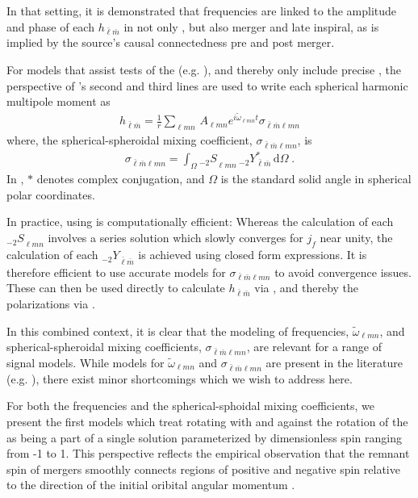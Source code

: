 \documentclass[twocolumn,aps,prd,floatfix,preprintnumbers,a4paper,nofootinbib,
superscriptaddress,10pt]{revtex4-1}
\newcommand{\cw}{\tilde{\omega}}
\def\jf{j_f}
\def\lmn{_{\ell m n}}
\def\LM{_{\bar{\ell} \bar{m}}}
\def\LMlmn{_{\bar{\ell} \bar{m} \ell m n}}
\begin{document}
%
In that setting, it is demonstrated that \qnm{} frequencies are linked to the amplitude and phase of each $h\LM$ in not only \rd{}, but also merger and late inspiral, as is implied by the source's causal connectedness pre and post merger.
%
%
\par For models that assist tests of the \nht{} (e.g. \cite{Berti:2005ys,London:2018gaq,Carullo:2018sfu}), and thereby only include precise , the perspective of 's second and third lines are used to write each spherical harmonic multipole moment as
%
\begin{align}
	\label{hlm}
	h\LM = \frac{1}{r} \sum\lmn \, A\lmn e^{i \cw\lmn t} \sigma\LMlmn
\end{align}
%
where, the spherical-spheroidal mixing coefficient, $\sigma\LMlmn$, is
%
\begin{align}
		\label{sigma}
		\sigma\LMlmn = \int_{\Omega} {_{-2}S}\lmn \,  {_{-2}}Y^*\LM \, \mathrm{d} \Omega \; .
\end{align}
%
In , $*$ denotes complex conjugation, and $\Omega$ is the standard solid angle in spherical polar coordinates.
%
\par In practice, using  is computationally efficient:
%
Whereas the calculation of each ${_{-2}S}\lmn$ involves a series solution which slowly converges for $\jf$ near unity, the calculation of each ${_{-2}Y}\LM$ is achieved using closed form expressions.
%
It is therefore efficient to use accurate models for $\sigma\LMlmn$ to avoid convergence issues. These can then be used directly to calculate $h\LM$ via , and thereby the \gw{} polarizations via .
%
%
\par In this combined context, it is clear that the modeling of \qnm{} frequencies, $\cw\lmn$, and spherical-spheroidal mixing coefficients, $\sigma\LMlmn$, are relevant for a range of \gw{} signal models.
%
While models for $\cw\lmn$ and $\sigma\LMlmn$ are present in the literature (e.g. \cite{Berti:2005ys, Berti:2014fga, Cook:2014cta}), there exist minor shortcomings which we wish to address here.
%
\par For both the \qnm{} frequencies and the spherical-sphoidal mixing coefficients, we present the first models which treat  rotating with and against the rotation of the \bh{} as being a part of a single solution parameterized by dimensionless \bh{} spin ranging from -1 to 1.
%
This perspective reflects the empirical observation that the remnant spin of \bbh{} mergers smoothly connects regions of positive and negative spin relative to the direction of the initial oribital angular momentum \cite{Husa:2015iqa,London:2018gaq}.
\end{document}
